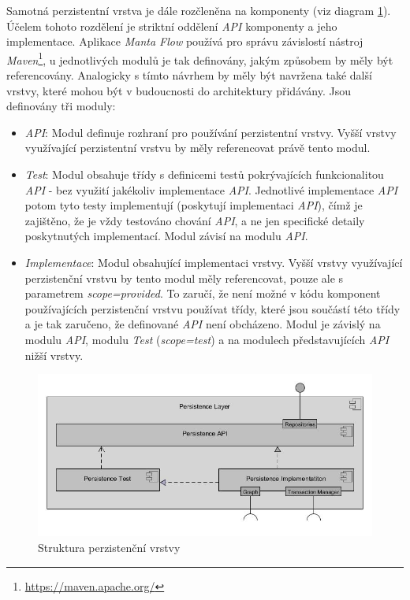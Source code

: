 Samotná perzistentní vrstva je dále rozčleněna na komponenty (viz diagram \ref{fig:des-persistence}). Účelem tohoto rozdělení je striktní oddělení \textit{API} komponenty a jeho implementace. Aplikace \textit{Manta Flow} používá pro správu závislostí nástroj \textit{Maven}\footnote{\url{https://maven.apache.org/}}, u jednotlivých modulů je tak definovány, jakým způsobem by měly být referencovány. Analogicky s tímto návrhem by měly být navržena také další vrstvy, které mohou být v budoucnosti do architektury přidávány. Jsou definovány tři moduly:

\begin{itemize}
   \item{\textit{API}}: Modul definuje rozhraní pro používání perzistentní vrstvy. Vyšší vrstvy využívající perzistentní vrstvu by měly referencovat právě tento modul.
   \item{\textit{Test}}: Modul obsahuje třídy s definicemi testů pokrývajících funkcionalitou \textit{API} - bez využití jakékoliv implementace \textit{API}. Jednotlivé implementace \textit{API} potom tyto testy implementují (poskytují implementaci \textit{API}), čímž je zajištěno, že je vždy testováno chování \textit{API}, a ne jen specifické detaily poskytnutých implementací. Modul závisí na modulu \textit{API}.
   \item{\textit{Implementace}}: Modul obsahující implementaci vrstvy. Vyšší vrstvy využívající perzistenční vrstvu by tento modul měly referencovat, pouze ale s parametrem \textit{scope=provided}. To zaručí, že není možné v kódu komponent používajících perzistenční vrstvu používat třídy, které jsou součástí této třídy a je tak zaručeno, že definované \textit{API} není obcházeno. Modul je závislý na modulu \textit{API}, modulu \textit{Test} (\textit{scope=test}) a na modulech představujících \textit{API} nižší vrstvy.
\end{itemize}

\begin{figure}
\begin{center}
\includegraphics[width=12cm]{figures/persistance_module}
\caption{Struktura perzistenční vrstvy}
\label{fig:des-persistence}
\end{center}
\end{figure}

